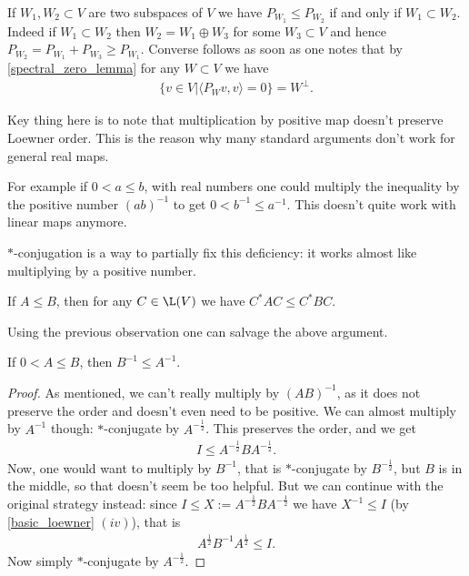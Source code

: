 \begin{esim}\label{projection_order}
	If $W_{1}, W_{2} \subset V$ are two subspaces of $V$ we have $P_{W_{1}} \leq P_{W_{2}}$ if and only if $W_{1} \subset W_{2}$. Indeed if $W_{1} \subset W_{2}$ then $W_{2} = W_{1} \oplus W_{3}$ for some $W_{3} \subset V$ and hence $P_{W_{2}} = P_{W_{1}} + P_{W_{3}} \geq P_{W_{1}}$. Converse follows as soon as one notes that by \ref{spectral_zero_lemma} for any $W \subset V$ we have
	\begin{align*}
		\{v \in V | \langle P_{W} v, v\rangle = 0\} = W^{\perp}.
	\end{align*}
\end{esim}

Key thing here is to note that multiplication by positive map doesn't preserve Loewner order. This is the reason why many standard arguments don't work for general real maps.

For example if $0 < a \leq b$, with real numbers one could multiply the inequality by the positive number $(a b)^{-1}$ to get $0 < b^{-1} \leq a^{-1}$. This doesn't quite work with linear maps anymore.

$*$-conjugation is a way to partially fix this deficiency: it works almost like multiplying by a positive number.

\begin{prop}
	If $A \leq B$, then for any $C \in \L(V)$ we have $C^{*} A C \leq C^{*} B C$.
\end{prop}

Using the previous observation one can salvage the above argument.

\begin{lause}\label{inverse_decreasing}
	If $0 < A \leq B$, then $B^{-1} \leq A^{-1}$.
\end{lause}
\begin{proof}
	As mentioned, we can't really multiply by $(A B)^{-1}$, as it does not preserve the order and doesn't even need to be positive. We can almost multiply by $A^{-1}$ though: $*$-conjugate by $A^{-\frac{1}{2}}$. This preserves the order, and we get
	\begin{align*}
		I \leq A^{-\frac{1}{2}} B A^{-\frac{1}{2}}.
	\end{align*}
	Now, one would want to multiply by $B^{-1}$, that is $*$-conjugate by $B^{-\frac{1}{2}}$, but $B$ is in the middle, so that doesn't seem be too helpful. But we can continue with the original strategy instead: since $I \leq X := A^{-\frac{1}{2}} B A^{-\frac{1}{2}}$ we have $X^{-1} \leq I$ (by \ref{basic_loewner} $(iv)$), that is
	\begin{align*}
		A^{\frac{1}{2}} B^{-1} A^{\frac{1}{2}} \leq I.
	\end{align*}
	Now simply $*$-conjugate by $A^{-\frac{1}{2}}$.
\end{proof}

